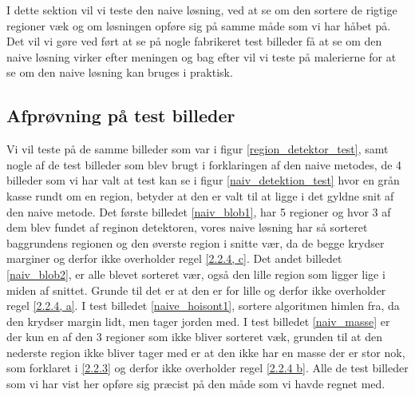 I dette sektion vil vi teste den naive løsning, ved at se om den sortere
de rigtige regioner væk og om løsningen opføre sig på samme måde som vi
har håbet på. Det vil vi gøre ved ført at se på nogle fabrikeret test
billeder få at se om den naive løsning virker efter meningen og bag
efter vil vi teste på malerierne for at se om den naive løsning kan
bruges i praktisk.
  
\subsection{Afprøvning på test billeder}
Vi vil teste på de samme billeder som var i figur
\ref{region_detektor_test}, samt nogle af de test billeder som blev
brugt i forklaringen af den naive metodes, de 4 billeder som vi har valt
at test kan se i figur \ref{naiv_detektion_test} hvor en grån kasse
rundt om en region, betyder at den er valt til at ligge i det gyldne
snit af den naive metode. Det første billedet \ref{naiv_blob1}, har 5
regioner og hvor 3 af dem blev fundet af reginon detektoren, vores naive
løsning har så sorteret baggrundens regionen og den øverste region i
snitte vær, da de begge krydser marginer og derfor ikke overholder regel
\ref{2.2.4, c}. Det andet billedet \ref{naiv_blob2}, er alle blevet
sorteret vær, også den lille region som ligger lige i miden af snittet.
Grunde til det er at den er for lille og derfor ikke overholder regel
\ref{2.2.4, a}. I test billedet \ref{naive_hoisont1}, sortere algoritmen
himlen fra, da den krydser margin lidt, men tager jorden med. I test
billedet \ref{naiv_masse} er der kun en af den 3 regioner som ikke
bliver sorteret væk, grunden til at den nederste region ikke bliver
tager med er at den ikke har en masse der er stor nok, som forklaret i
\ref{2.2.3} og derfor ikke overholder regel \ref{2.2.4 b}. Alle de test
billeder som vi har vist her opføre sig præcist på den måde som vi havde
regnet med.

